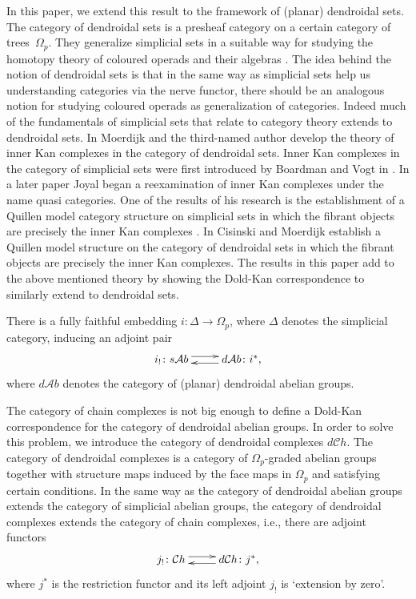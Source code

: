 \documentclass[a4paper]{amsart}
\theoremstyle{plain}
\theoremstyle{definition}
\theoremstyle{remark}
\newcommand{\A}{\mathcal{A}b}
\newcommand{\Ch}{\mathcal{C}h}
\numberwithin{equation}{section}
\numberwithin{figure}{section}
\begin{document}
In this paper, we extend this result to the framework of (planar)
dendroidal sets. The category of dendroidal sets is a presheaf
category on a certain category of trees~$\Omega_p$. They generalize
simplicial sets in a suitable way for studying the homotopy theory
of coloured operads and their algebras \cite{moerdijkweiss}. The
idea behind the notion of dendroidal sets is that in the same way as
simplicial sets help us understanding categories via the nerve
functor, there should be an analogous notion for studying coloured
operads as generalization of categories. Indeed much of the fundamentals of simplicial sets
that relate to category theory extends to dendroidal sets. In \cite{moerdijkweiss2} Moerdijk and the third-named
author develop the theory of inner Kan complexes in the category of dendroidal sets. Inner Kan complexes in
the category of simplicial sets were first introduced by Boardman and Vogt in \cite{BV73}. In a later paper
\cite{joyal} Joyal began a reexamination of inner Kan complexes under the name quasi categories.
One of the results of his research is the establishment of a Quillen model category structure on simplicial
sets in which the fibrant objects are precisely the inner Kan complexes  \cite{lurie}.
In \cite{moerdijkcisinski} Cisinski and Moerdijk establish a Quillen model structure on the category of dendroidal
sets in which the fibrant objects are precisely the inner Kan complexes.
The results in this paper add to the above mentioned theory by showing the Dold-Kan correspondence to similarly
extend to dendroidal sets.

There is a fully faithful
embedding $i\colon\Delta\longrightarrow\Omega_p$, where $\Delta$
denotes the simplicial category, inducing an adjoint pair
$$
    \xymatrix{
        i_!\colon s\A \ar@<3pt>[r] & \ar@<3pt>[l] d\A\colon i^*,
    }
$$
where $d\A$ denotes the category of (planar) dendroidal abelian
groups.

The category of chain complexes is not big enough to define a Dold-Kan correspondence for the category of dendroidal abelian groups. In order to
solve this problem, we introduce the category of dendroidal complexes $d\Ch$. The category of dendroidal complexes is a category of $\Omega_p$-graded abelian groups together with structure maps induced by the face maps in $\Omega_p$ and satisfying certain conditions. In the same way as the category of dendroidal abelian groups extends the category of simplicial abelian groups, the category of dendroidal complexes extends the category of chain complexes, i.e., there are adjoint functors
$$
    \xymatrix{
        j_!\colon \Ch \ar@<3pt>[r] & \ar@<3pt>[l] d\Ch\colon j^*,
    }
$$
where $j^*$ is the restriction functor and its left adjoint $j_!$ is `extension by zero'.
\end{document}
